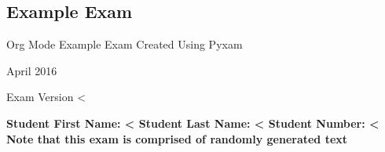 \documentclass[12pt]{exam}
\begin{document}
    \begin{center}
        \section*{Example Exam}
    \end{center}
    \begin{center}
        Org Mode Example Exam Created Using Pyxam
    \end{center}
    \begin{center}
        April 2016
    \end{center}
    \begin{center}
        Exam Version <%
    \end{center}
    \textbf{Student First Name: <%
    \textbf{Student Last Name: <%
    \textbf{Student Number: <%
    \\
    Note that this exam is comprised of randomly generated text
    \clearpage
}}}
\end{document}
